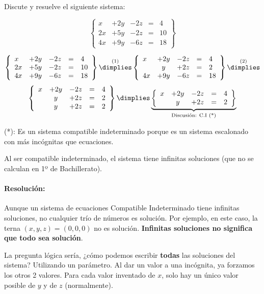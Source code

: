 \begin{problem}

Discute y resuelve el siguiente sistema:

\[
\left\{\begin{array}{lcccl}
x&+2y&-2z&=&4\\
2x&+5y&-2z&=&10\\
4x&+9y&-6z&=&18
\end{array}\right\}
\]

\solution

\[
\left\{\begin{array}{lcccl}
x&+2y&-2z&=&4\\
2x&+5y&-2z&=&10\\
4x&+9y&-6z&=&18
\end{array}\right\}
\overset{(1)}{\dimplies}
\left\{\begin{array}{lcccl}
x&+2y&-2z&=&4\\
 &y&+2z&=&2 \\
4x&+9y&-6z&=&18
\end{array}\right\}
\overset{(2)}{\dimplies}\]
\[
\left\{\begin{array}{lcccl}
x&+2y&-2z&=&4\\
 &y&+2z&=&2 \\
 &y&+2z&=&2 \\
\end{array}\right\}
\dimplies
\underbrace{\left\{\begin{array}{lcccl}
x&+2y&-2z&=&4\\
 &y&+2z&=&2 
\end{array}\right\}}_{\text{Discusión: C.I (*)}}
\]

(*): Es un sistema compatible indeterminado porque es un sistema escalonado con más incógnitas que ecuaciones.

Al ser compatible indeterminado, el sistema tiene infinitas soluciones (que no se calculan en 1º de Bachillerato).


\paragraph{Resolución:} Aunque un sistema de ecuaciones Compatible Indeterminado tiene infinitas soluciones, no cualquier trío de números es solución. 
%
Por ejemplo, en este caso, la terna $(x,y,z) = (0,0,0)$ no es solución.
%
\textbf{Infinitas soluciones no significa que todo sea solución}.

La pregunta lógica sería, ¿cómo podemos escribir \textbf{todas} las soluciones del sistema? Utilizando un parámetro.
%
Al dar un valor a una incógnita, ya forzamos los otros 2 valores. 
%
Para cada valor inventado de $x$, solo hay un único valor posible de $y$ y de $z$ (normalmente).


\end{problem}

